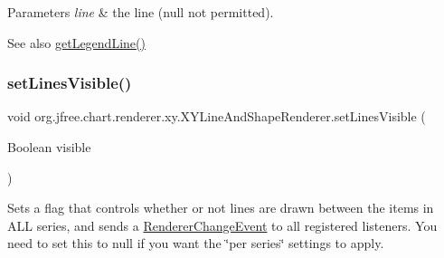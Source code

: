 \begin{DoxyParams}{Parameters}
{\em line} & the line ({\ttfamily null} not permitted).\\
\hline
\end{DoxyParams}
\begin{DoxySeeAlso}{See also}
\mbox{\hyperlink{classorg_1_1jfree_1_1chart_1_1renderer_1_1xy_1_1_x_y_line_and_shape_renderer_ae016f74b6e454ecf1143b2e542aa35cc}{get\+Legend\+Line()}} 
\end{DoxySeeAlso}
\mbox{\label{classorg_1_1jfree_1_1chart_1_1renderer_1_1xy_1_1_x_y_line_and_shape_renderer_a806284dac4ab82c45330b32f2ce96961}} 
\subsubsection{\texorpdfstring{set\+Lines\+Visible()}{setLinesVisible()}\hspace{0.1cm}{\footnotesize\ttfamily [1/2]}}
{\footnotesize\ttfamily void org.\+jfree.\+chart.\+renderer.\+xy.\+X\+Y\+Line\+And\+Shape\+Renderer.\+set\+Lines\+Visible (\begin{DoxyParamCaption}\item[{Boolean}]{visible }\end{DoxyParamCaption})}

Sets a flag that controls whether or not lines are drawn between the items in A\+LL series, and sends a \mbox{\hyperlink{}{Renderer\+Change\+Event}} to all registered listeners. You need to set this to {\ttfamily null} if you want the \char`\"{}per series\char`\"{} settings to apply.


